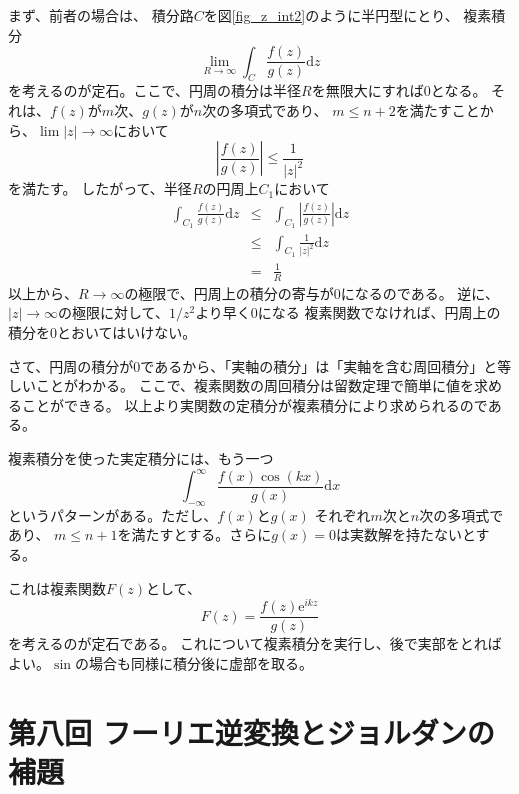 \documentclass{jarticle}
\newcommand{\diff}{\mathrm d}
\newcommand{\e}{\mathrm e}
\begin{document}
まず、前者の場合は、
積分路$C$を図\ref{fig_z_int2}のように半円型にとり、
複素積分
\begin{equation}
  \lim_{R \rightarrow \infty}\int_C \frac{f(z)}{g(z)} \diff z
\end{equation}
を考えるのが定石。ここで、円周の積分は半径$R$を無限大にすれば$0$となる。
それは、$f(z)$が$m$次、$g(z)$が$n$次の多項式であり、
$m\le n + 2$を満たすことから、$\lim |z| \rightarrow \infty$において
\begin{equation}
  \left| \frac{f(z)}{g(z)} \right| \leq \frac{1}{|z|^2}
\end{equation}
を満たす。
したがって、半径$R$の円周上$C_1$において
\begin{eqnarray}
  \int_{C_1} \frac{f(z)}{g(z)} \diff z &\leq& \int_{C_1} \left| \frac{f(z)}{g(z)} \right| \diff z \\
  &\leq& \int_{C_1}  \frac{1}{|z|^2} \diff z\\
  &= & \frac{1}{R}
\end{eqnarray}
以上から、$R \rightarrow \infty$の極限で、円周上の積分の寄与が$0$になるのである。
逆に、$|z| \rightarrow \infty$の極限に対して、$1/z^2$より早く$0$になる
複素関数でなければ、円周上の積分を$0$とおいてはいけない。

さて、円周の積分が$0$であるから、「実軸の積分」は「実軸を含む周回積分」と等しいことがわかる。
ここで、複素関数の周回積分は留数定理で簡単に値を求めることができる。
以上より実関数の定積分が複素積分により求められるのである。

複素積分を使った実定積分には、もう一つ
\begin{equation}
  \int_{-\infty}^{\infty} \frac{f(x)\cos(kx)}{g(x)} \diff x
\end{equation}
というパターンがある。ただし、$f(x)$と$g(x)$
それぞれ$m$次と$n$次の多項式であり、
$m\le n + 1$を満たすとする。さらに$g(x)=0$は実数解を持たないとする。

これは複素関数$F(z)$として、
\begin{equation}
  F(z) =  \frac{f(z) \e^{ikz}}{g(z)}
\end{equation}
を考えるのが定石である。
これについて複素積分を実行し、後で実部をとればよい。$\sin$の場合も同様に積分後に虚部を取る。

\newpage
\section{第八回 フーリエ逆変換とジョルダンの補題}
\end{document}

